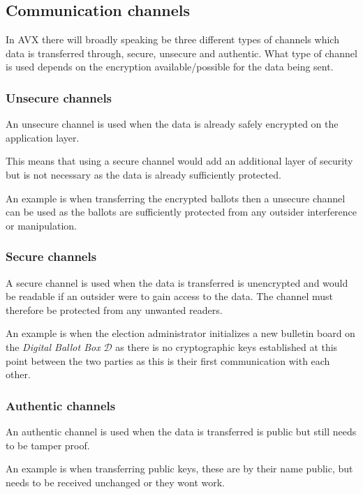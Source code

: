 \subsection{Communication channels} \label{sec: communication channels}
In AVX there will broadly speaking be three different types of channels which data is transferred through, secure, unsecure and authentic. What type of channel is used depends on the encryption available/possible for the data being sent.


\subsubsection{Unsecure channels}
An unsecure channel is used when the data is already safely encrypted on the application layer. 

This means that using a secure channel would add an additional layer of security but is not necessary as the data is already sufficiently protected. 

An example is when transferring the encrypted ballots then a unsecure channel can be used as the ballots are sufficiently protected from any outsider interference or manipulation.


\subsubsection{Secure channels}
A secure channel is used when the data is transferred is unencrypted and would be readable if an outsider were to gain access to the data. The channel must therefore be protected from any unwanted readers.

An example is when the election administrator initializes a new bulletin board on the \textit{Digital Ballot Box} $\mathcal{D}$ as there is no cryptographic keys established at this point between the two parties as this is their first communication with each other.


\subsubsection{Authentic channels}
An authentic channel is used when the data is transferred is public but still needs to be tamper proof. 

An example is when transferring public keys, these are by their name public, but needs to be received unchanged or they wont work.
